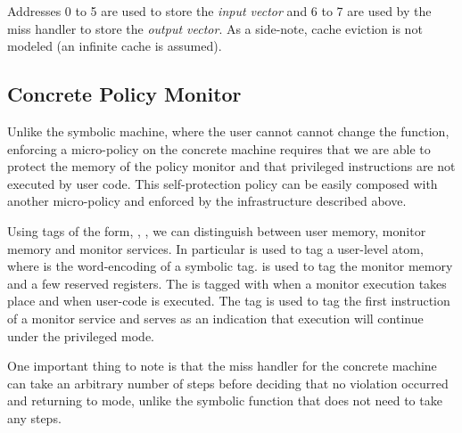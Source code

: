 
Addresses 0 to 5 are used to store the \emph{input vector} and 6 to 7 are used
by the miss handler to store the \emph{output vector}. As a side-note, cache 
eviction is not modeled (an infinite cache is assumed).

\subsection{Concrete Policy Monitor}\label{sec:concrete_policy}

Unlike the symbolic machine, where the user cannot cannot change the 
\TRANSFER function, enforcing a micro-policy on the concrete machine requires
that we are able to protect the memory of the policy monitor and that privileged
instructions are not executed by user code. This self-protection policy can be 
easily composed with another micro-policy and enforced by the infrastructure
described above. 

Using tags of the form, , , \MONITOR we can 
distinguish between user memory, monitor memory and monitor services. 
In particular  is used to tag a user-level atom, where  is
the word-encoding of a symbolic tag. \MONITOR is used to tag the monitor memory
and a few reserved registers. The \pc is tagged with \MONITOR when a monitor
execution takes place and  when user-code is executed. The tag
 is used to tag the first instruction of a monitor service and 
serves as an indication that execution will continue under the privileged
\MONITOR mode.

One important thing to note is that the miss handler for the concrete machine
can take an arbitrary number of steps before deciding that no violation occurred
and returning to \USERname  mode, unlike the symbolic \TRANSFER function that
does not need to take any steps.
